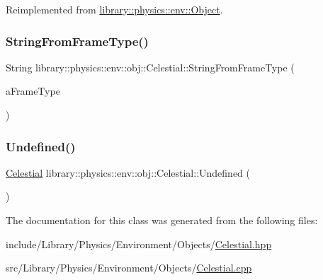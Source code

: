 Reimplemented from \hyperlink{classlibrary_1_1physics_1_1env_1_1_object_a7035edc921681401ddd43b094645a024}{library\+::physics\+::env\+::\+Object}.

\mbox{\label{classlibrary_1_1physics_1_1env_1_1obj_1_1_celestial_a020864aa551a1ec6f5674cc2e166b131}} 
\subsubsection{\texorpdfstring{String\+From\+Frame\+Type()}{StringFromFrameType()}}
{\footnotesize\ttfamily String library\+::physics\+::env\+::obj\+::\+Celestial\+::\+String\+From\+Frame\+Type (\begin{DoxyParamCaption}\item[{const \hyperlink{classlibrary_1_1physics_1_1env_1_1obj_1_1_celestial_a8585fb32125cb6c73ae1339a5ea09c79}{Celestial\+::\+Frame\+Type} \&}]{a\+Frame\+Type }\end{DoxyParamCaption})\hspace{0.3cm}{\ttfamily [static]}}

\mbox{\label{classlibrary_1_1physics_1_1env_1_1obj_1_1_celestial_a5e33230d05d77f5e1132151ecf5e94e9}} 
\subsubsection{\texorpdfstring{Undefined()}{Undefined()}}
{\footnotesize\ttfamily \hyperlink{classlibrary_1_1physics_1_1env_1_1obj_1_1_celestial}{Celestial} library\+::physics\+::env\+::obj\+::\+Celestial\+::\+Undefined (\begin{DoxyParamCaption}{ }\end{DoxyParamCaption})\hspace{0.3cm}{\ttfamily [static]}}



The documentation for this class was generated from the following files\+:\begin{DoxyCompactItemize}
\item 
include/\+Library/\+Physics/\+Environment/\+Objects/\hyperlink{_celestial_8hpp}{Celestial.\+hpp}\item 
src/\+Library/\+Physics/\+Environment/\+Objects/\hyperlink{_celestial_8cpp}{Celestial.\+cpp}\end{DoxyCompactItemize}
